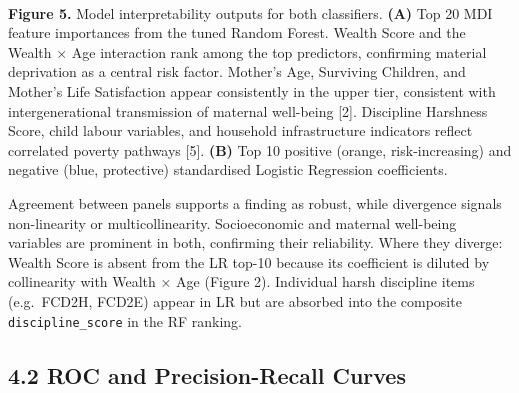 \documentclass[11pt]{article}
\begin{document}
    \begin{center}
    \end{center}
    { \hspace*{\fill} \\}
    
    \textbf{Figure 5.} Model interpretability outputs for both classifiers.
\textbf{(A)} Top 20 MDI feature importances from the tuned Random
Forest. Wealth Score and the Wealth × Age interaction rank among the top
predictors, confirming material deprivation as a central risk factor.
Mother's Age, Surviving Children, and Mother's Life Satisfaction appear
consistently in the upper tier, consistent with intergenerational
transmission of maternal well-being {[}2{]}. Discipline Harshness Score,
child labour variables, and household infrastructure indicators reflect
correlated poverty pathways {[}5{]}. \textbf{(B)} Top 10 positive
(orange, risk-increasing) and negative (blue, protective) standardised
Logistic Regression coefficients.

Agreement between panels supports a finding as robust, while divergence
signals non-linearity or multicollinearity. Socioeconomic and maternal
well-being variables are prominent in both, confirming their
reliability. Where they diverge: Wealth Score is absent from the LR
top-10 because its coefficient is diluted by collinearity with Wealth ×
Age (Figure 2). Individual harsh discipline items (e.g.~FCD2H, FCD2E)
appear in LR but are absorbed into the composite
\texttt{discipline\_score} in the RF ranking.

    \hypertarget{roc-and-precision-recall-curves}{%
\subsection{4.2 ROC and Precision-Recall
Curves}\label{roc-and-precision-recall-curves}}
\end{document}
